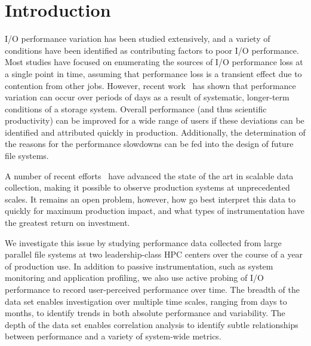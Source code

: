\section{Introduction}

I/O performance variation has been studied extensively, and a variety of conditions have been identified as contributing factors to poor I/O performance.  Most studies have focused on enumerating the sources of I/O performance loss at a single point in time, assuming that performance loss is a transient effect due to contention from other jobs.  However, recent work~\cite{Lockwood2017} has shown that performance variation can occur over periods of days as a result of systematic, longer-term conditions of a storage system.
%
Overall performance (and thus scientific productivity) can be improved for a
wide range of users if these deviations can be identified and attributed
quickly in production. Additionally, the determination of the reasons for the performance slowdowns can be fed into the design of future file systems. 


A number of recent efforts~\cite{Lockwood2017,Vazhkudai2017guide,Agelastos2014ldms,Kunkel2014siox} have advanced the
state of the art in scalable data collection, making it possible to observe
production systems at unprecedented scales.  It remains an open problem,
however, how go  best interpret this data to quickly for maximum production
impact, and what types of instrumentation have the greatest return on
investment.

We investigate this issue by studying performance data collected
from large parallel file systems at two leadership-class HPC centers
over the course of a year of production use.  In addition to passive
instrumentation, such as system monitoring and application profiling,
we also use active probing of I/O performance to record user-perceived
performance over time.  The breadth of the data set enables investigation
over multiple time scales, ranging from days to months, to identify trends in
both absolute performance and variability.  The depth of the data set
enables correlation analysis to identify subtle relationships between
performance and a variety of system-wide metrics.

